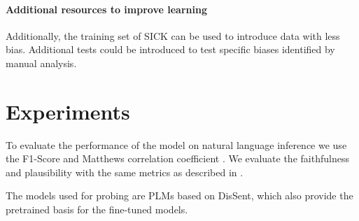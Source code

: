 \documentclass[12pt,a4paper]{article}
\begin{document}
\paragraph{Additional resources to improve learning} Additionally, the training set of SICK can be used to introduce data with less bias. Additional tests could be introduced to test specific biases identified by manual analysis.

\section{Experiments}
To evaluate the performance of the model on natural language inference we use the F1-Score and Matthews correlation coefficient \parencite{matthews1975comparison}. We evaluate the faithfulness and plausibility with the same metrics as described in \cite{attanasio2022ferret}.

The models used for probing are \acp{PLM} based on DisSent, which also provide the pretrained basis for the fine-tuned models.

\printbibliography
\end{document}
